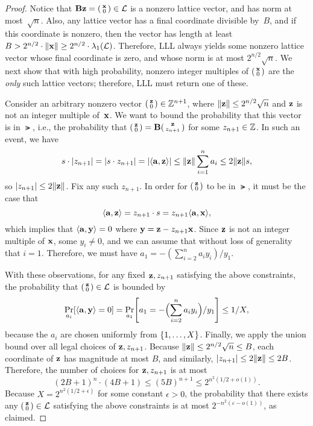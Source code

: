 \documentclass[11pt]{article}
\newcommand{\smlmat}[1]{\parens{
    \begin{smallmatrix}
      #1
    \end{smallmatrix}
  }
}
\begin{document}
\begin{proof}
  Notice that $\matB \vecz = \smlmat{\vecx \\ 0} \in \lat$ is a
  nonzero lattice vector, and has norm at most~$\sqrt{n}$. Also, any
  lattice vector has a final coordinate divisible by~$B$, and if this
  coordinate is nonzero, then the vector has length at least
  $B > 2^{n/2} \cdot \length{\vecx} \geq 2^{n/2} \cdot
  \lambda_{1}(\lat)$. Therefore, LLL always yields some nonzero
  lattice vector whose final coordinate is zero, and whose norm is at
  most $2^{n/2} \sqrt{n}$. We next show that with high probability,
  nonzero integer multiples of $\smlmat{\vecx \\ 0}$ are the
  \emph{only} such lattice vectors; therefore, LLL must return one of
  these.

  Consider an arbitrary nonzero vector
  $\smlmat{\vecz \\ 0} \in \Z^{n+1}$, where
  $\length{\vecz} \leq 2^{n/2} \sqrt{n}$ and $\vecz$ is not an integer
  multiple of~$\vecx$. We want to bound the probability that this
  vector is in $\lat$, i.e., the probability that
  $\smlmat{\vecz \\ 0} = \matB \smlmat{\vecz \\ z_{n+1}}$ for some
  $z_{n+1} \in \Z$. In such an event, we have
  \[ s \cdot \abs{z_{n+1}} = \abs{s \cdot z_{n+1}} =
    \abs*{\inner{\veca,\vecz}} \leq \length{\vecz} \sum_{i=1}^n a_i
    \leq 2 \length{\vecz} s, \] so $|z_{n+1}| \leq 2\length{\vecz}$.
  Fix any such $z_{n+1}$. In order for $\smlmat{\vecz \\ 0}$ to be in
  $\lat$, it must be the case that
  \[
    \inner{\veca, \vecz} = z_{n+1} \cdot s = z_{n+1}
    \inner{\veca,\vecx}, \] which implies that
  $\inner{\veca, \vecy} = 0$ where $\vecy = \vecz - z_{n+1} \vecx$.
  Since $\vecz$ is not an integer multiple of $\vecx$, some
  $y_{i} \neq 0$, and we can assume that without loss of generality
  that $i=1$. Therefore, we must have
  $a_{1} = -(\sum_{i=2}^{n} a_{i} y_{i})/y_{1}$.

  With these observations, for any fixed $\vecz, z_{n+1}$ satisfying
  the above constraints, the probability that
  $\smlmat{\vecz \\ 0} \in \lat$ is bounded by
  \[ \Pr_{a_i} \bracks*{\inner{\veca, \vecy} = 0} =
    \Pr_{a_1}\bracks*{a_1 = -\parens[\Big]{\sum_{i=2}^n a_i
        y_{i}}/y_{1}} \leq 1/X, \] because the $a_i$ are chosen
  uniformly from $\set{1,\ldots,X}$. Finally, we apply the union bound
  over all legal choices of $\vecz, z_{n+1}$. Because
  $\length{\vecz} \leq 2^{n/2} \sqrt{n} \leq B$, each coordinate of
  $\vecz$ has magnitude at most $B$, and similarly,
  $\abs{z_{n+1}} \leq 2 \length{\vecz} \leq 2B$. Therefore, the number
  of choices for $\vecz, z_{n+1}$ is at most
  \[ (2B+1)^{n} \cdot (4B+1) \leq (5B)^{n+1} \leq
    2^{n^{2}(1/2+o(1))}. \] Because $X = 2^{n^{2}(1/2+\epsilon)}$ for
  some constant $\epsilon > 0$, the probability that there exists any
  $\smlmat{\vecz \\ 0} \in \lat$ satisfying the above constraints is
  at most $2^{-n^{2}(\varepsilon - o(1))}$, as claimed.
\end{proof}
\end{document}
